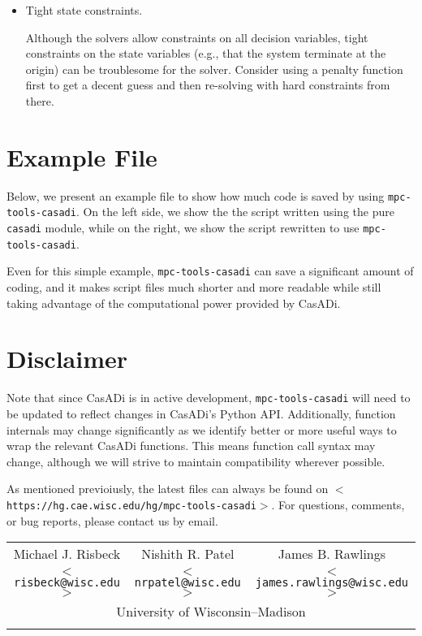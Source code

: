\documentclass{article}
\newcommand{\smallurl}[2][\scriptsize]{\texttt{#1$<$#2$>$}}
\newcommand{\casadi}{CasADi}
\begin{document}
\begin{itemize}
    \item Tight state constraints.
    
    Although the solvers allow constraints on all decision variables, tight constraints on the state variables (e.g., that the system terminate at the origin) can be troublesome for the solver.
    Consider using a penalty function first to get a decent guess and then re-solving with hard constraints from there.
    
\end{itemize}

\section{Example File}

Below, we present an example file to show how much code is saved by using \texttt{mpc-tools-casadi}.
On the left side, we show the the script written using the pure \texttt{casadi} module, while on the right, we show the script rewritten to use \texttt{mpc-tools-casadi}.

\hspace{1em}



Even for this simple example, \texttt{mpc-tools-casadi} can save a significant amount of coding, and it makes script files much shorter and more readable while still taking advantage of the computational power provided by \casadi{}.

\section{Disclaimer}

Note that since \casadi{} is in active development, \texttt{mpc-tools-casadi} will need to be updated to reflect changes in \casadi{}'s Python API.
Additionally, function internals may change significantly as we identify better or more useful ways to wrap the relevant \casadi{} functions.
This means function call syntax may change, although we will strive to maintain compatibility wherever possible.

As mentioned previoiusly, the latest files can always be found on \smallurl{https://hg.cae.wisc.edu/hg/mpc-tools-casadi}.
For questions, comments, or bug reports, please contact us by email.

\begin{center}
\begin{tabular}{ccc}
    Michael J. Risbeck & Nishith R. Patel & James B. Rawlings \\
    \smallurl[\small]{risbeck@wisc.edu} & \smallurl[\small]{nrpatel@wisc.edu} & \smallurl[\small]{james.rawlings@wisc.edu} \\
    \multicolumn{3}{c}{University of Wisconsin--Madison} \\
    \hspace*{.2\textwidth} & \hspace*{.2\textwidth} & \hspace*{.2\textwidth} %
\end{tabular}
\end{center}
\end{document}
